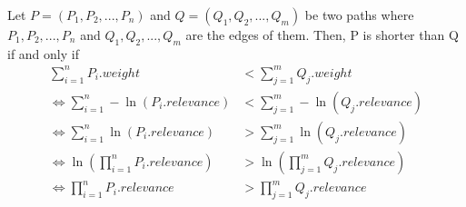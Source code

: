 \documentclass[11pt]{article}
\begin{document}
Let $P = (P_1,P_2,...,P_n)$ and $Q = (Q_1,Q_2,...,Q_m)$ be two paths
where $P_1,P_2,...,P_n$ and $Q_1,Q_2,...,Q_m$ are the edges of them.
Then, P is shorter than Q if and only if
\begin{align*}
  \sum_{i=1}^n P_i.weight & < \sum_{j=1}^m Q_j.weight\\
  \Leftrightarrow \sum_{i=1}^n -\ln(P_i.relevance) & < \sum_{j=1}^m -\ln(Q_j.relevance)\\
  \Leftrightarrow \sum_{i=1}^n \ln(P_i.relevance) & > \sum_{j=1}^m \ln(Q_j.relevance)\\
  \Leftrightarrow \ln(\prod_{i=1}^nP_i.relevance) & > \ln(\prod_{j=1}^m Q_j.relevance)\\
  \Leftrightarrow \prod_{i=1}^nP_i.relevance & > \prod_{j=1}^m Q_j.relevance\\
\end{align*}

\label{mylastpagelabel}
\end{document}
